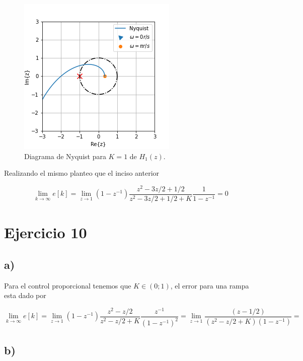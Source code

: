 \documentclass{article}
\begin{document}
        \begin{figure}[!htb]
            \centering
            \includegraphics[width=.5\textwidth]{Img/9-b-nyquist.png}
            \caption{Diagrama de Nyquist para $K=1$ de $H_1(z)$.}
            \label{fig:9-b-nyquist}
        \end{figure}

        Realizando el mismo planteo que el inciso anterior 

        \begin{equation}
            \lim_{k \to \infty} e[k] = 
            \lim_{z \to 1} (1 - z^{-1}) \frac{z^2 - 3z/2 + 1/2}{z^2 - 3z/2 + 1/2 + K} \frac{1}{1-z^{-1}} = 0
        \end{equation}

    \section{Ejercicio 10}

        \subsection{a)}

            Para el control proporcional tenemos que $K \in (0;1)$, el error para una rampa esta dado por 

            \begin{equation}
                \lim_{k \to \infty} e[k] = \lim_{z \to 1} (1 - z^{-1}) \frac{z^2 - z/2}{z^2 - z/2 + K} \frac{z^{-1}}{(1-z^{-1})^2}
                = \lim_{z \to 1} \frac{(z-1/2)}{(z^2 - z/2 + K)(1-z^{-1})} = 
            \end{equation}
    
        \subsection{b)}
\end{document}
